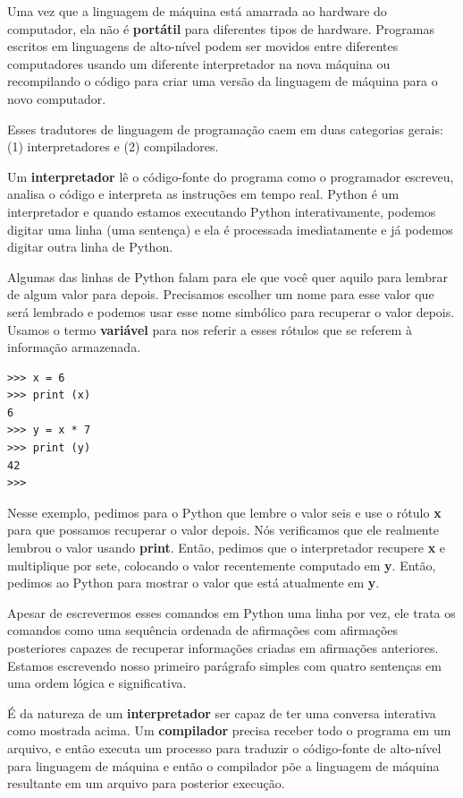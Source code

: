 Uma vez que a linguagem de máquina está amarrada ao hardware do computador, ela não é {\bf portátil} para diferentes tipos de hardware. Programas escritos em linguagens de alto-nível podem ser movidos entre diferentes computadores usando um diferente interpretador na nova máquina ou recompilando o código para criar uma versão da linguagem de máquina para o novo computador.

Esses tradutores de linguagem de programação caem em duas categorias gerais:
(1) interpretadores e (2) compiladores.

Um {\bf interpretador} lê o código-fonte do programa como o programador escreveu, analisa o código e interpreta as instruções em tempo real.
Python é um interpretador e quando estamos executando Python interativamente, podemos digitar uma linha (uma sentença) e ela é processada imediatamente e já podemos digitar outra linha de Python.   

Algumas das linhas de Python falam para ele que você quer aquilo para lembrar de algum valor para depois. Precisamos escolher um nome para esse valor que será lembrado e podemos usar esse nome simbólico para recuperar o valor depois. Usamos o termo {\bf variável} para nos referir a esses rótulos que se referem à informação armazenada.


\begin{verbatim}
>>> x = 6
>>> print (x)
6
>>> y = x * 7
>>> print (y)
42
>>> 
\end{verbatim}

%
Nesse exemplo, pedimos para o Python que lembre o valor seis e use o rótulo {\bf x} para que possamos recuperar o valor depois. Nós verificamos que ele realmente lembrou o valor usando {\bf print}. Então, pedimos que o interpretador recupere {\bf x} e multiplique por sete, colocando o valor recentemente computado em {\bf y}. Então, pedimos ao Python para mostrar o valor que está atualmente em {\bf y}.

Apesar de escrevermos esses comandos em Python uma linha por vez, ele trata os comandos como uma sequência ordenada de afirmações com afirmações posteriores capazes de recuperar informações criadas em afirmações anteriores.  Estamos escrevendo nosso primeiro parágrafo simples com quatro sentenças em uma ordem lógica e significativa.

É da natureza de um {\bf interpretador} ser capaz de ter uma conversa interativa como mostrada acima. Um {\bf compilador} precisa receber todo o programa em um arquivo, e então executa um processo para traduzir o código-fonte de alto-nível para linguagem de máquina e então o compilador põe a linguagem de máquina resultante em um arquivo para posterior execução.

